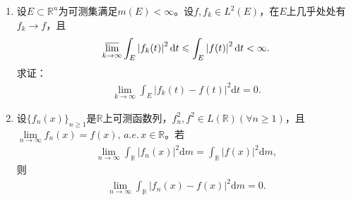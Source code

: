 \documentclass[../../main.tex]{subfiles}%
\begin{document}
\begin{example}
\begin{enumerate}[(1)]
\item 设$E\subset\mathbb{R}^n$为可测集满足$m(E)<\infty$。设$f,f_k\in L^2(E)$，在$E$上几乎处处有$f_k\rightarrow f$，且
\begin{align*}
\varlimsup\limits_{k\rightarrow\infty}\int_E\left|f_k(t)\right|^2\mathrm{d}t\leqslant\int_E\left|f(t)\right|^2\mathrm{d}t<\infty.
\end{align*}
求证：
\begin{align*}
\lim\limits_{k\rightarrow\infty}\int_E\left|f_k(t)-f(t)\right|^2\mathrm{d}t=0.
\end{align*}

\item 设$\{f_n(x)\}_{n\geqslant 1}$是$\mathbb{R}$上可测函数列，$f_n^2,f^2\in L(\mathbb{R})(\forall n\geqslant 1)$，且$\lim\limits_{n\rightarrow\infty}f_n(x)=f(x),\,a.e.\, x\in\mathbb{R}$。若
\begin{align*}
\lim\limits_{n\rightarrow\infty}\int_{\mathbb{R}}|f_n(x)|^2\mathrm{d}m=\int_{\mathbb{R}}|f(x)|^2\mathrm{d}m,
\end{align*}
则
\begin{align*}
\lim\limits_{n\rightarrow\infty}\int_{\mathbb{R}}|f_n(x)-f(x)|^2\mathrm{d}m=0.
\end{align*}
\end{enumerate}
\end{example}
\end{document}
